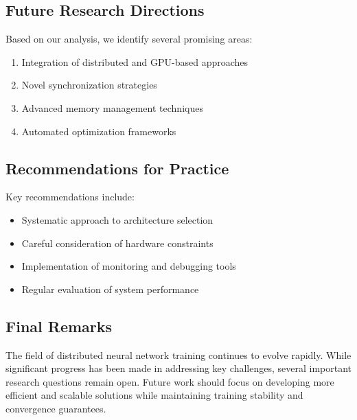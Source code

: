 \subsection{Future Research Directions}
Based on our analysis, we identify several promising areas:
\begin{enumerate}
    \item Integration of distributed and GPU-based approaches
    \item Novel synchronization strategies
    \item Advanced memory management techniques
    \item Automated optimization frameworks
\end{enumerate}

\subsection{Recommendations for Practice}
Key recommendations include:
\begin{itemize}
    \item Systematic approach to architecture selection
    \item Careful consideration of hardware constraints
    \item Implementation of monitoring and debugging tools
    \item Regular evaluation of system performance
\end{itemize}

\subsection{Final Remarks}
The field of distributed neural network training continues to evolve rapidly. While significant progress has been made in addressing key challenges, several important research questions remain open. Future work should focus on developing more efficient and scalable solutions while maintaining training stability and convergence guarantees. 
